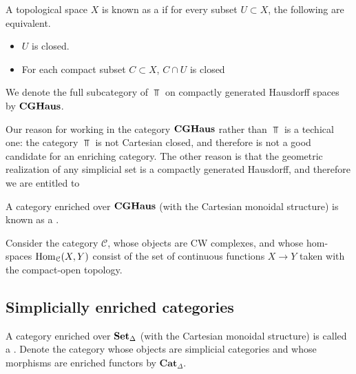 \documentclass[main.tex]{subfiles}
\begin{document}
\begin{definition}
  \label{def:compactly_generated_hausdorff_space}
  A topological space $X$ is known as a  if for every subset $U \subset X$, the following are equivalent.
  \begin{itemize}
    \item $U$ is closed.

    \item For each compact subset $C \subset X$, $C \cap U$ is closed
  \end{itemize}

  We denote the full subcategory of $\Top$ on compactly generated Hausdorff spaces by $\mathbf{CGHaus}$.
\end{definition}

Our reason for working in the category $\mathbf{CGHaus}$ rather than $\Top$ is a techical one: the category $\Top$ is not Cartesian closed, and therefore is not a good candidate for an enriching category. The other reason is that the geometric realization of any simplicial set is a compactly generated Hausdorff, and therefore we are entitled to

\begin{definition}
  \label{def:topological_category}
  A category enriched over $\mathbf{CGHaus}$ (with the Cartesian monoidal structure) is known as a .
\end{definition}

\begin{example}
  Consider the category $\mathcal{C}$, whose objects are CW complexes, and whose hom-spaces $\operatorname{Hom}_{\mathcal{C}}(X, Y)$ consist of the set of continuous functions $X \to Y$ taken with the compact-open topology.
\end{example}

\subsection{Simplicially enriched categories}
\label{ssc:simplicially_enriched_categories}

\begin{definition}
  \label{def:simplicial_category}
  A category enriched over $\operatorname{\mathbf{Set}_{\Delta}}$ (with the Cartesian monoidal structure) is called a . Denote the category whose objects are simplicial categories and whose morphisms are enriched functors by $\mathbf{Cat}_{\Delta}$.
\end{definition}
\end{document}
